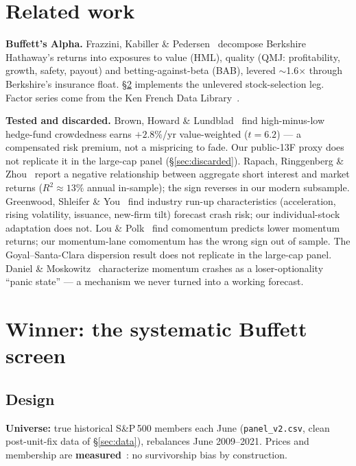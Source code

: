 \documentclass[11pt,a4paper]{article}
\begin{document}
\section{Related work}
\label{sec:related}

\textbf{Buffett's Alpha.} Frazzini, Kabiller \& Pedersen~\cite{FKP2018} decompose Berkshire Hathaway's returns into exposures to value (HML), quality (QMJ: profitability, growth, safety, payout) and betting-against-beta (BAB), levered $\sim$1.6$\times$ through Berkshire's insurance float. \S\ref{sec:buffett} implements the unlevered stock-selection leg. Factor series come from the Ken French Data Library~\cite{FF}.

\textbf{Tested and discarded.} Brown, Howard \& Lundblad~\cite{BHL2022} find high-minus-low hedge-fund crowdedness earns $+2.8\%$/yr value-weighted ($t=6.2$) --- a compensated risk premium, not a mispricing to fade. Our public-13F proxy does not replicate it in the large-cap panel (\S\ref{sec:discarded}). Rapach, Ringgenberg \& Zhou~\cite{RRZ2016} report a negative relationship between aggregate short interest and market returns ($R^2\approx13\%$ annual in-sample); the sign reverses in our modern subsample. Greenwood, Shleifer \& You~\cite{GSY2019} find industry run-up characteristics (acceleration, rising volatility, issuance, new-firm tilt) forecast crash risk; our individual-stock adaptation does not. Lou \& Polk~\cite{LP2022} find comomentum predicts lower momentum returns; our momentum-lane comomentum has the wrong sign out of sample. The Goyal--Santa-Clara dispersion result does not replicate in the large-cap panel. Daniel \& Moskowitz~\cite{DM2016} characterize momentum crashes as a loser-optionality ``panic state'' --- a mechanism we never turned into a working forecast.

\section{Winner: the systematic Buffett screen}
\label{sec:buffett}

\subsection{Design}

\textbf{Universe:} true historical S\&P\,500 members each June (\texttt{panel\_v2.csv}, clean post-unit-fix data of \S\ref{sec:data}), rebalances June 2009--2021. Prices and membership are \textbf{measured}~\cite{yahoo,sp500}: no survivorship bias by construction.
\end{document}
